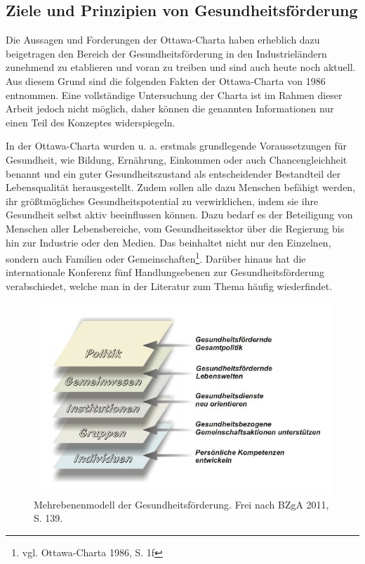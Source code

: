 \subsection{Ziele und Prinzipien von Gesundheitsförderung}
\label{sec:ZieleUndPrinzipienVonGesundheitsförderung}

Die Aussagen und Forderungen der Ottawa-Charta haben erheblich dazu beigetragen den Bereich der Gesundheitsförderung in den Industrieländern zunehmend zu etablieren und voran zu treiben und sind auch heute noch aktuell. Aus diesem Grund sind die folgenden Fakten der Ottawa-Charta von 1986 entnommen. Eine vollständige Untersuchung der Charta ist im Rahmen dieser Arbeit jedoch nicht möglich, daher können die genannten Informationen nur einen Teil des Konzeptes widerspiegeln.

In  der Ottawa-Charta wurden u. a. erstmals grundlegende Voraussetzungen für Gesundheit, wie Bildung, Ernährung, Einkommen oder auch Chancengleichheit benannt und ein guter Gesundheitszustand als entscheidender Bestandteil der Lebensqualität herausgestellt. Zudem sollen alle dazu Menschen befähigt werden, ihr größtmögliches Gesundheitspotential zu verwirklichen, indem sie ihre Gesundheit selbst aktiv beeinflussen können. Dazu bedarf es der Beteiligung von Menschen aller Lebensbereiche, vom Gesundheitssektor über die Regierung bis hin zur Industrie oder den Medien. Das beinhaltet nicht nur den Einzelnen, sondern auch Familien oder Gemeinschaften\footnote{vgl. Ottawa-Charta 1986, S. 1f}. Darüber hinaus hat die internationale Konferenz fünf Handlungsebenen zur Gesundheitsförderung verabschiedet, welche man in der Literatur zum Thema häufig wiederfindet.

\begin{figure}[h]
	\centering
		\includegraphics[scale=0.45]{mehrebenenmodell.jpg}
	\caption{Mehrebenenmodell der Gesundheitsförderung. Frei nach BZgA 2011, S. 139.}
	\label{fig:mehrebenenmodell}
\end{figure}

